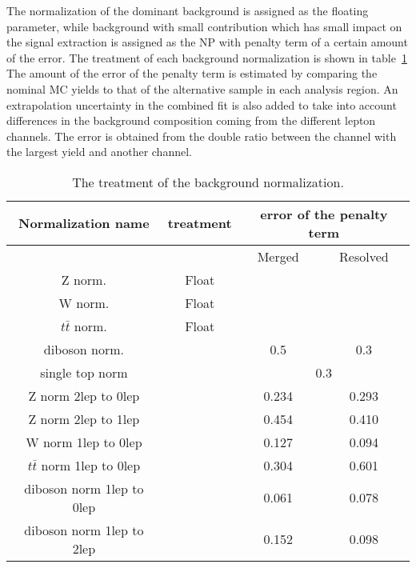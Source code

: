 The normalization of the dominant background is assigned as the floating parameter, while background with small contribution which has small impact on the signal extraction is assigned as the NP with penalty term of a certain amount of the error.
The treatment of each background normalization is shown in table~\ref{tab:bkgnorm}
The amount of the error of the penalty term is estimated by comparing the nominal MC yields to that of the alternative sample in each analysis region.
An extrapolation uncertainty in the combined fit is also added to take into account differences in the background composition coming from the different lepton channels. The error is obtained from the double ratio between the channel with the largest yield and another channel.
\begin{table}[htbp]
 \footnotesize
\begin{center}
\begin{tabular}{ | c | c | c | c |} \hline
Normalization name        & treatment   & \multicolumn{2}{|c|}{error of the penalty term} \\ \hline \hline
\multicolumn{2}{|c|}{}                     & Merged    & Resolved  \\ \hline 
Z norm.             & Float       &      &\\ \hline
W norm.             & Float       &       &\\ \hline 
$t\bar{t}$ norm.    & Float       &       &\\ \hline
diboson norm.     &             & 0.5    &  0.3 \\ \hline
single top norm           &             & \multicolumn{2}{|c|}{0.3}\\ \hline \hline
Z norm 2lep to 0lep        &             & 0.234  &   0.293 \\ \hline
Z norm 2lep to 1lep       &             & 0.454  &  0.410  \\ \hline
W norm 1lep to 0lep       &             & 0.127     & 0.094\\ \hline
$t\bar{t}$ norm 1lep to 0lep     &             & 0.304     & 0.601\\ \hline
diboson norm 1lep to 0lep    &             & 0.061     &0.078 \\ \hline
diboson norm 1lep to 2lep       &             & 0.152     & 0.098\\ \hline
\end{tabular}
\caption{\label{tab:bkgnorm} The treatment of the background normalization. }
\end{center}
\end{table}

